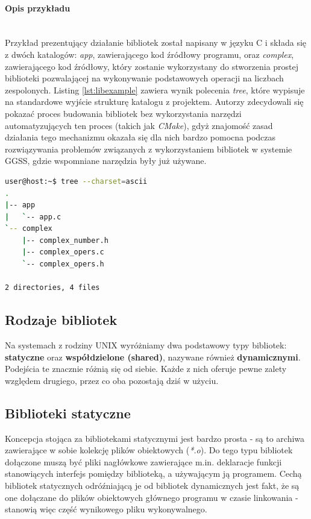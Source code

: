 \paragraph*{Opis przykładu}\mbox{}\\
Przykład prezentujący działanie bibliotek został napisany w języku C i  składa się z dwóch katalogów: \textit{app}, zawierającego kod źródłowy programu, oraz \textit{complex}, zawierającego kod źródłowy, który zostanie wykorzystany do stworzenia prostej biblioteki pozwalającej na wykonywanie podstawowych operacji na liczbach zespolonych. Listing \ref{lst:libexample} zawiera wynik polecenia \textit{tree}, które wypisuje na standardowe wyjście strukturę katalogu z projektem. Autorzy zdecydowali się pokazać proces budowania bibliotek bez wykorzystania narzędzi automatyzujących ten proces (takich jak \textit{CMake}), gdyż znajomość zasad działania tego mechanizmu okazała się dla nich bardzo pomocna podczas rozwiązywania problemów związanych z wykorzystaniem bibliotek w systemie GGSS, gdzie wspomniane narzędzia były już używane.

\begin{lstlisting}[language=bash, caption={Struktura katalogów projektu stanowiącego bazę przykładu dotyczącego bibliotek.},label={lst:libexample}]
user@host:~$ tree --charset=ascii
.
|-- app
|   `-- app.c
`-- complex
    |-- complex_number.h
    |-- complex_opers.c
    `-- complex_opers.h

2 directories, 4 files
\end{lstlisting}

\subsection{Rodzaje bibliotek}
Na systemach z rodziny UNIX wyróżniamy dwa podstawowy typy bibliotek: \textbf{statyczne} oraz \textbf{współdzielone (shared)}, nazywane również \textbf{dynamicznymi}. Podejścia te znacznie różnią się od siebie. Każde z nich oferuje pewne zalety względem drugiego, przez co oba pozostają dziś w użyciu.

\subsection{Biblioteki statyczne}
Koncepcja stojąca za bibliotekami statycznymi jest bardzo prosta - są to archiwa zawierające w sobie kolekcję plików obiektowych (\textit{*.o}). Do tego typu bibliotek dołączone muszą być pliki nagłówkowe zawierające m.in. deklaracje funkcji stanowiących interfejs pomiędzy biblioteką, a używającym ją programem. Cechą bibliotek statycznych odróźniającą je od bibliotek dynamicznych jest fakt, że są one dołączane do plików obiektowych głównego programu w czasie linkowania - stanowią więc część wynikowego pliku wykonywalnego. 



